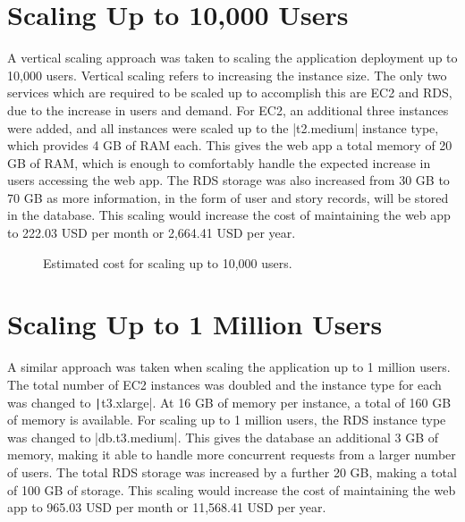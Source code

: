 \clearpage
\section{Scaling Up to 10,000 Users}\label{sec:scaling-up-to-10000-users}
A vertical scaling approach was taken to scaling the application deployment up to 10,000 users.
Vertical scaling refers to increasing the instance size.
The only two services which are required to be scaled up to accomplish this are EC2 and RDS, due to the increase
in users and demand.
For EC2, an additional three instances were added, and all instances were scaled up to the |t2.medium|
instance type, which provides 4 GB of RAM each.
This gives the web app a total memory of 20 GB of RAM, which is enough to comfortably handle the expected
increase in users accessing the web app.
The RDS storage was also increased from 30 GB to 70 GB as more information, in the form of user and story records,
will be stored in the database.
This scaling would increase the cost of maintaining the web app to 222.03 USD per month or 2,664.41 USD per year.

\begin{figure}[!htbp]
    \centering
    \hfill
    \caption{Estimated cost for scaling up to 10,000 users.}
    \label{fig:10,000-users}
\end{figure}

\clearpage
\section{Scaling Up to 1 Million Users}\label{sec:scaling-up-to-1-million-users}
A similar approach was taken when scaling the application up to 1 million users.
The total number of EC2 instances was doubled and the instance type for each was changed to
\texttt|t3.xlarge|.
At 16 GB of memory per instance, a total of 160 GB of memory is available.
For scaling up to 1 million users, the RDS instance type was changed to |db.t3.medium|.
This gives the database an additional 3 GB of memory, making it able to handle more concurrent
requests from a larger number of users.
The total RDS storage was increased by a further 20 GB, making a total of 100 GB of storage.
This scaling would increase the cost of maintaining the web app to 965.03 USD per month or 11,568.41 USD per year.


